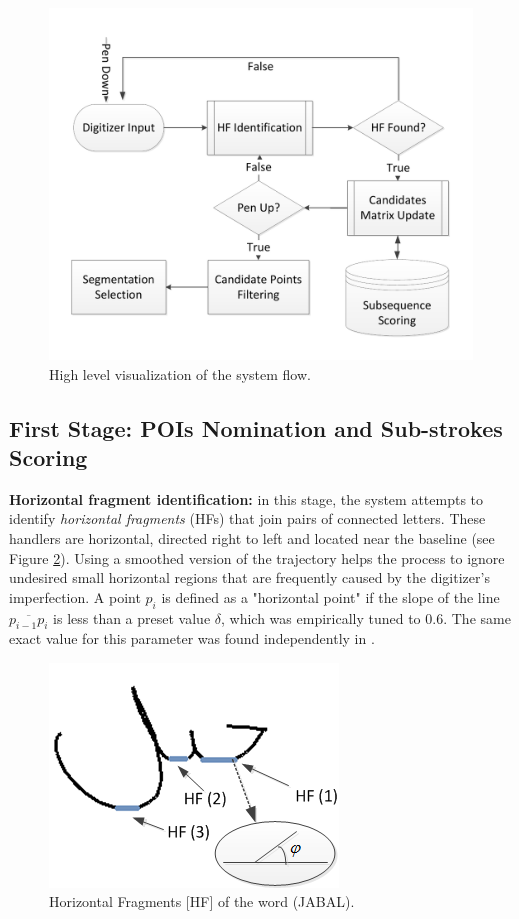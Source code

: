 \documentclass[10pt, conference, compsocconf]{IEEEtran}
\begin{document}
\begin{figure}
\centering
\includegraphics[width=0.9\columnwidth]{./figures/system_flow}
\caption{High level visualization of the system flow.}
\label{fig:system_flow}
\end{figure}

\subsection{First Stage: POIs Nomination and Sub-strokes Scoring}

\textbf{Horizontal fragment identification:} in this stage, the system attempts to identify \emph{horizontal fragments} (HFs) that join pairs of connected letters. 
These handlers are horizontal, directed right to left and located near the baseline (see Figure  \ref{fig:horizontal_fragments}). 
Using a smoothed version of the trajectory helps the process to ignore undesired small horizontal regions that are frequently caused by the digitizer's imperfection.  
A point $p_{i}$ is defined as a "horizontal point" if the slope of the line $\overline{p_{i-1}p_{i}}$ is less than a preset value $\delta$, which was empirically tuned to $0.6$. The same exact value for this parameter was found independently in \cite{daifallah2009recognition}.\\

\begin{figure}
\centering
\includegraphics[width=0.45\columnwidth]{./figures/horizontal_fragments}
\caption{Horizontal Fragments [HF] of the word  (JABAL).}
\label{fig:horizontal_fragments}
\end{figure}
\end{document}
